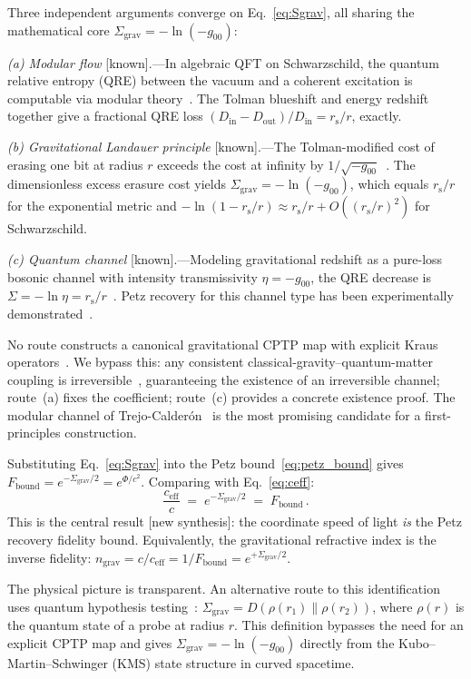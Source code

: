 \documentclass[prl,twocolumn,superscriptaddress,floatfix,nofootinbib]{revtex4-2}
\newcommand{\ceff}{c_{\mathrm{eff}}}
\newcommand{\rs}{r_{\mathrm{s}}}
\newcommand{\Sgrav}{\Sigma_{\mathrm{grav}}}
\newcommand{\Fbound}{F_{\mathrm{bound}}}
\newcommand{\nref}{n_{\mathrm{grav}}}
\begin{document}
Three independent arguments converge on
Eq.~\eqref{eq:Sgrav}, all sharing the mathematical core
$\Sgrav = -\ln(-g_{00})$:

\emph{(a) Modular flow} [known].---In algebraic QFT on
Schwarzschild, the quantum relative entropy (QRE)
between the vacuum and a coherent excitation is
computable via modular theory~\cite{DorauMuch2025}.
The Tolman blueshift and energy redshift together give
a fractional QRE loss
$(D_{\mathrm{in}} - D_{\mathrm{out}})/D_{\mathrm{in}}
= \rs/r$, exactly.

\emph{(b) Gravitational Landauer principle} [known].---The
Tolman-modified cost of erasing one bit at radius $r$
exceeds the cost at infinity by
$1/\sqrt{-g_{00}}$~\cite{Herrera2020}.
The dimensionless excess erasure cost yields
$\Sgrav = -\ln(-g_{00})$, which equals $\rs/r$ for the
exponential metric and
$-\ln(1 - \rs/r) \approx \rs/r + O((\rs/r)^2)$ for
Schwarzschild.

\emph{(c) Quantum channel} [known].---Modeling gravitational
redshift as a pure-loss bosonic channel with intensity
transmissivity $\eta = -g_{00}$, the QRE decrease is
$\Sigma = -\ln\eta = \rs/r$~\cite{AhmadiFuentes2014}.
Petz recovery for this channel type has been experimentally
demonstrated~\cite{ChenSongScarani2025}.

No route constructs a canonical gravitational CPTP map with
explicit Kraus operators~\cite{KasprzakTjoa2024}.
We bypass this: any consistent classical-gravity--quantum-matter
coupling is irreversible~\cite{GalleyGiacominiSelby2023},
guaranteeing the existence of an irreversible channel; route~(a)
fixes the coefficient; route~(c) provides a concrete existence
proof.
The modular channel of Trejo-Calder\'{o}n~\cite{TrejoCalderon2025}
is the most promising candidate for a first-principles construction.

Substituting Eq.~\eqref{eq:Sgrav} into the Petz
bound~\eqref{eq:petz_bound} gives $\Fbound = e^{-\Sgrav/2}
= e^{\Phi/c^2}$. Comparing with Eq.~\eqref{eq:ceff}:
\begin{equation}
  \boxed{\;\frac{\ceff}{c}
  \;=\; e^{-\Sgrav/2}
  \;=\; \Fbound\,.\;}
  \label{eq:triple}
\end{equation}
This is the central result [new synthesis]: the coordinate
speed of light \emph{is} the Petz recovery fidelity bound.
Equivalently, the gravitational refractive index is the
inverse fidelity:
$\nref = c/\ceff = 1/\Fbound = e^{+\Sgrav/2}$.

The physical picture is transparent.
An alternative route to this identification uses quantum
hypothesis testing~\cite{HayashiYamasaki2025}:
$\Sgrav = D(\rho(r_1)\|\rho(r_2))$, where $\rho(r)$
is the quantum state of a probe at radius $r$.
This definition bypasses the need for an explicit CPTP
map and gives $\Sgrav = -\ln(-g_{00})$ directly from the
Kubo--Martin--Schwinger (KMS) state structure in curved
spacetime.
\end{document}
